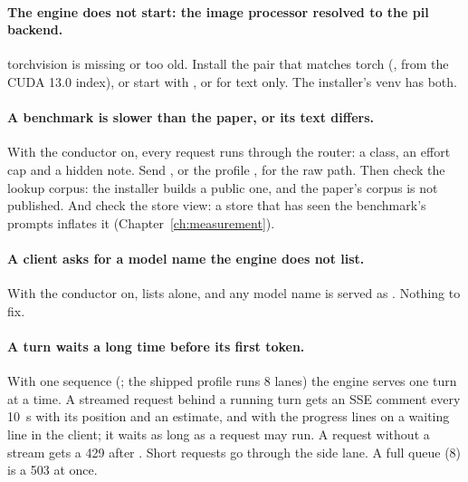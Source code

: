 \paragraph{The engine does not start: the image processor resolved to the pil backend.} torchvision is missing or too old. Install the pair that matches torch (,  from the CUDA 13.0 index), or start with , or  for text only. The installer's venv has both.

\paragraph{A benchmark is slower than the paper, or its text differs.} With the conductor on, every request runs through the router: a class, an effort cap and a hidden note. Send , or the profile , for the raw path. Then check the lookup corpus: the installer builds a public one, and the paper's corpus is not published. And check the store view: a store that has seen the benchmark's prompts inflates it (Chapter~\ref{ch:measurement}).

\paragraph{A client asks for a model name the engine does not list.} With the conductor on,  lists  alone, and any model name is served as . Nothing to fix.

\paragraph{A turn waits a long time before its first token.} With one sequence (; the shipped profile runs 8 lanes) the engine serves one turn at a time. A streamed request behind a running turn gets an SSE comment every 10~s with its position and an estimate, and with the progress lines on a waiting line in the client; it waits as long as a request may run. A request without a stream gets a 429 after . Short requests go through the side lane. A full queue (8) is a 503 at once.

